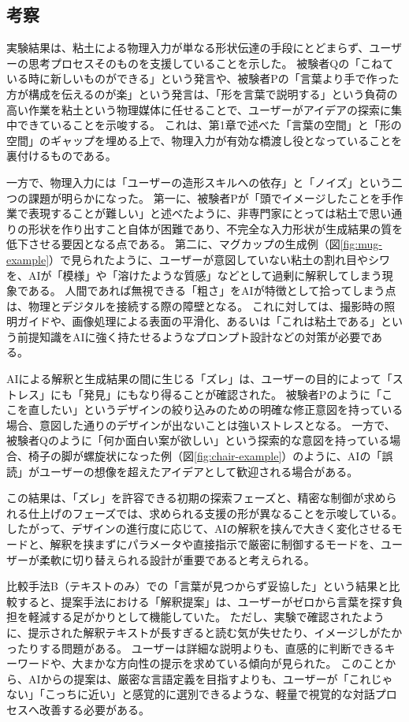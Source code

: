 \documentclass{kuisthesis}
\begin{document}
\subsection{考察} 
実験結果は、粘土による物理入力が単なる形状伝達の手段にとどまらず、ユーザーの思考プロセスそのものを支援していることを示した。 
被験者Qの「こねている時に新しいものができる」という発言や、被験者Pの「言葉より手で作った方が構成を伝えるのが楽」という発言は、「形を言葉で説明する」という負荷の高い作業を粘土という物理媒体に任せることで、ユーザーがアイデアの探索に集中できていることを示唆する。 
これは、第1章で述べた「言葉の空間」と「形の空間」のギャップを埋める上で、物理入力が有効な橋渡し役となっていることを裏付けるものである。

一方で、物理入力には「ユーザーの造形スキルへの依存」と「ノイズ」という二つの課題が明らかになった。 
第一に、被験者Pが「頭でイメージしたことを手作業で表現することが難しい」と述べたように、非専門家にとっては粘土で思い通りの形状を作り出すこと自体が困難であり、不完全な入力形状が生成結果の質を低下させる要因となる点である。
第二に、マグカップの生成例（図\ref{fig:mug-example}）で見られたように、ユーザーが意図していない粘土の割れ目やシワを、AIが「模様」や「溶けたような質感」などとして過剰に解釈してしまう現象である。 
人間であれば無視できる「粗さ」をAIが特徴として拾ってしまう点は、物理とデジタルを接続する際の障壁となる。 
これに対しては、撮影時の照明ガイドや、画像処理による表面の平滑化、あるいは「これは粘土である」という前提知識をAIに強く持たせるようなプロンプト設計などの対策が必要である。

AIによる解釈と生成結果の間に生じる「ズレ」は、ユーザーの目的によって「ストレス」にも「発見」にもなり得ることが確認された。 
被験者Pのように「ここを直したい」というデザインの絞り込みのための明確な修正意図を持っている場合、意図した通りのデザインが出ないことは強いストレスとなる。 
一方で、被験者Qのように「何か面白い案が欲しい」という探索的な意図を持っている場合、椅子の脚が螺旋状になった例（図\ref{fig:chair-example}）のように、AIの「誤読」がユーザーの想像を超えたアイデアとして歓迎される場合がある。

この結果は、「ズレ」を許容できる初期の探索フェーズと、精密な制御が求められる仕上げのフェーズでは、求められる支援の形が異なることを示唆している。 
したがって、デザインの進行度に応じて、AIの解釈を挟んで大きく変化させるモードと、解釈を挟まずにパラメータや直接指示で厳密に制御するモードを、ユーザーが柔軟に切り替えられる設計が重要であると考えられる。

比較手法B（テキストのみ）での「言葉が見つからず妥協した」という結果と比較すると、提案手法における「解釈提案」は、ユーザーがゼロから言葉を探す負担を軽減する足がかりとして機能していた。 
ただし、実験で確認されたように、提示された解釈テキストが長すぎると読む気が失せたり、イメージしがたかったりする問題がある。 
ユーザーは詳細な説明よりも、直感的に判断できるキーワードや、大まかな方向性の提示を求めている傾向が見られた。 
このことから、AIからの提案は、厳密な言語定義を目指すよりも、ユーザーが「これじゃない」「こっちに近い」と感覚的に選別できるような、軽量で視覚的な対話プロセスへ改善する必要がある。
\end{document}
